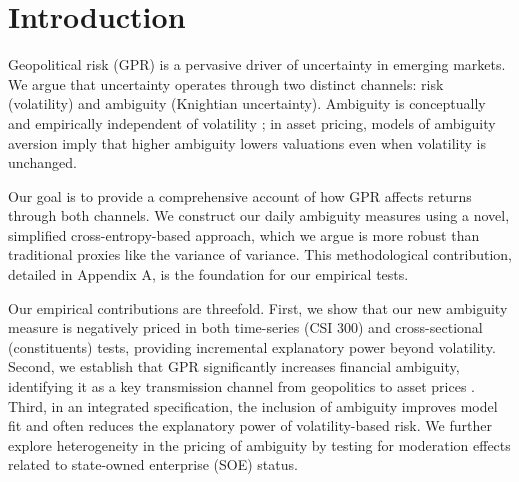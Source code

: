 \documentclass[preprint,12pt,authoryear]{elsarticle}
\begin{document}
\section{Introduction}

Geopolitical risk (GPR) is a pervasive driver of uncertainty in emerging markets. We argue that uncertainty operates through two distinct channels: risk (volatility) and ambiguity (Knightian uncertainty). Ambiguity is conceptually and empirically independent of volatility \citep{Knight1921, Ellsberg1961}; in asset pricing, models of ambiguity aversion \citep{Gilboa1989, Klibanoff2005} imply that higher ambiguity lowers valuations even when volatility is unchanged.

Our goal is to provide a comprehensive account of how GPR affects returns through both channels. We construct our daily ambiguity measures using a novel, simplified cross-entropy-based approach, which we argue is more robust than traditional proxies like the variance of variance. This methodological contribution, detailed in Appendix A, is the foundation for our empirical tests.

Our empirical contributions are threefold. First, we show that our new ambiguity measure is negatively priced in both time-series (CSI 300) and cross-sectional (constituents) tests, providing incremental explanatory power beyond volatility. Second, we establish that GPR significantly increases financial ambiguity, identifying it as a key transmission channel from geopolitics to asset prices \citep{Caldara2022}. Third, in an integrated specification, the inclusion of ambiguity improves model fit and often reduces the explanatory power of volatility-based risk. We further explore heterogeneity in the pricing of ambiguity by testing for moderation effects related to state-owned enterprise (SOE) status.
\end{document}
